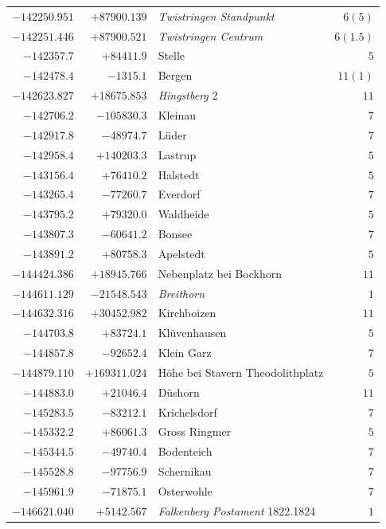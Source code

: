 \begin{center}
\begin{tabular}{r|r|p{170pt}|r}
\(-142250.951\)&\(+87900.139\)&\textit{Twistringen Standpunkt}&\(6 (5)\)\\
\(-142251.446\)&\(+87900.521\)&\textit{Twistringen Centrum}&\(6(1.5)\)\\
\(-142357.7\)&\(+84411.9\)&Stelle&\(5\)\\
\(-142478.4\)&\(-1315.1\)&Bergen&\(11 (1)\)\\
\(-142623.827\)&\(+18675.853\)&\textit{Hingstberg} 2&\(11\)\\
\(-142706.2\)&\(-105830.3\)&Kleinau&\(7\)\\
\(-142917.8\)&\(-48974.7\)&Lüder&\(7\)\\
\(-142958.4\)&\(+140203.3\)&Lastrup&\(5\)\\
\(-143156.4\)&\(+76410.2\)&Halstedt&\(5\)\\
\(-143265.4\)&\(-77260.7\)&Everdorf&\(7\)\\
\(-143795.2\)&\(+79320.0\)&Waldheide&\(5\)\\
\(-143807.3\)&\(-60641.2\)&Bonsee&\(7\)\\
\(-143891.2\)&\(+80758.3\)&Apelstedt&\(5\)\\
\(-144424.386\)&\(+18945.766\)&Nebenplatz bei Bockhorn&\(11\)\\
\(-144611.129\)&\(-21548.543\)&\textit{Breithorn}&\(1\)\\
\(-144632.316\)&\(+30452.982\)&Kirchboizen&\(11\)\\
\(-144703.8\)&\(+83724.1\)&Klüvenhausen&\(5\)\\
\(-144857.8\)&\(-92652.4\)&Klein Garz&\(7\)\\
\(-144879.110\)&\(+169311.024\)&Höhe bei Stavern Theodolithplatz&\(5\)\\
\(-144883.0\)&\(+21046.4\)&Düshorn&\(11\)\\
\(-145283.5\)&\(-83212.1\)&Krichelsdorf&\(7\)\\
\(-145332.2\)&\(+86061.3\)&Gross Ringmer&\(5\)\\
\(-145344.5\)&\(-49740.4\)&Bodenteich&\(7\)\\
\(-145528.8\)&\(-97756.9\)&Schernikau&\(7\)\\
\(-145961.9\)&\(-71875.1\)&Osterwohle&\(7\)\\
\(-146621.040\)&\(+5142.567\)&\textit{Falkenberg Postament} 1822.1824&\(1\)\\
\hline\end{tabular}\endgroup\end{center}
